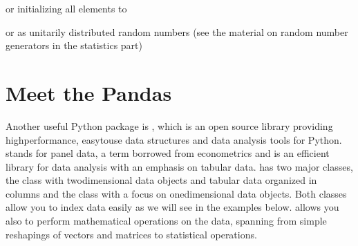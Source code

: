 \documentclass[letterpaper,10pt,english]{sphinxmanual}
\begin{document}
or initializing all elements to

\begin{sphinxVerbatim}[commandchars=\\\{\}]
   
  
     
\end{sphinxVerbatim}

or as unitarily distributed random numbers (see the material on random number generators in the statistics part)

\begin{sphinxVerbatim}[commandchars=\\\{\}]
   
  
   
\end{sphinxVerbatim}


\section{Meet the Pandas}
\label{\detokenize{chapter1:meet-the-pandas}}








Another useful Python package is
, which is an open source library
providing high\sphinxhyphen{}performance, easy\sphinxhyphen{}to\sphinxhyphen{}use data structures and data
analysis tools for Python.  stands for panel data, a term borrowed from econometrics and is an efficient library for data analysis with an emphasis on tabular data.
 has two major classes, the  class with two\sphinxhyphen{}dimensional data objects and tabular data organized in columns and the class  with a focus on one\sphinxhyphen{}dimensional data objects. Both classes allow you to index data easily as we will see in the examples below.
 allows you also to perform mathematical operations on the data, spanning from simple reshapings of vectors and matrices to statistical operations.
\end{document}
